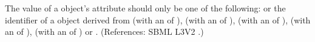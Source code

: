 The value of a \Species object's  attribute should
only be one of the following:  or the
identifier of a \UnitDefinition object derived from  (with an
 of ),  (with an  of
),  (with an  of ), 
(with an  of ),  (with an
 of ) or .  (References: SBML
L3V2 .)
